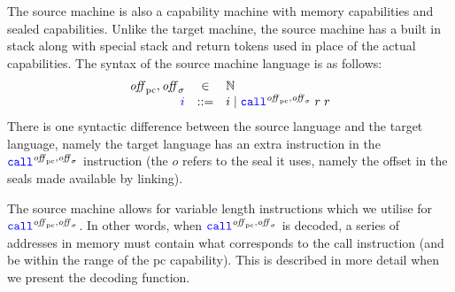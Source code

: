 \documentclass[a4paper]{article}
\begin{document}

The source machine is also a capability machine with memory capabilities and sealed capabilities. Unlike the target machine, the source machine has a built in stack along with special stack and return tokens used in place of the actual capabilities. The syntax of the source machine language is as follows:
\[
  \begin{array}{rcl}
    \offpc,\offsigma & \in & \nats \\
    \src{i} & \defbnf &  \com{i} \mid \scall{\offpc,\offsigma}{r}{r}
  \end{array}
\]
There is one syntactic difference between the source language and the target language, namely the target language has an extra instruction in the $\scall{\offpc,\offsigma}{}{}$ instruction (the $o$ refers to the seal it uses, namely the offset in the seals made available by linking). 

The source machine allows for variable length instructions which we utilise for $\scall{\offpc,\offsigma}{}{}$. In other words, when $\scall{\offpc,\offsigma}{}{}$ is decoded, a series of addresses in memory must contain what corresponds to the call instruction (and be within the range of the pc capability). This is described in more detail when we present the decoding function.
\end{document}
